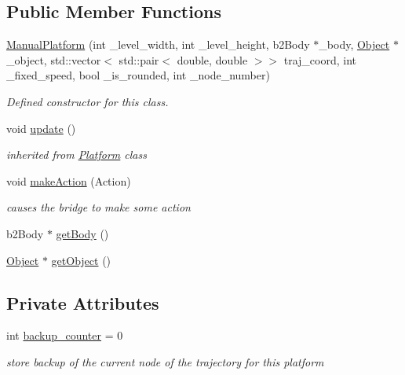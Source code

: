 \subsection*{Public Member Functions}
\begin{DoxyCompactItemize}
\item 
\hyperlink{class_manual_platform_a0192ef683b0f19b93bd238af98f8ce51}{Manual\+Platform} (int \+\_\+level\+\_\+width, int \+\_\+level\+\_\+height, b2\+Body $\ast$\+\_\+body, \hyperlink{class_object}{Object} $\ast$\+\_\+object, std\+::vector$<$ std\+::pair$<$ double, double $>$$>$ traj\+\_\+coord, int \+\_\+fixed\+\_\+speed, bool \+\_\+is\+\_\+rounded, int \+\_\+node\+\_\+number)
\begin{DoxyCompactList}\small\item\em Defined constructor for this class. \end{DoxyCompactList}\item 
\mbox{\label{class_manual_platform_ae77ccd8210c4ee32606b3475154325d4}} 
void \hyperlink{class_manual_platform_ae77ccd8210c4ee32606b3475154325d4}{update} ()
\begin{DoxyCompactList}\small\item\em inherited from \hyperlink{class_platform}{Platform} class \end{DoxyCompactList}\item 
void \hyperlink{class_manual_platform_ad7ae2aac108330a84246e3337fb5af81}{make\+Action} (Action)
\begin{DoxyCompactList}\small\item\em causes the bridge to make some action \end{DoxyCompactList}\item 
b2\+Body $\ast$ \hyperlink{class_manual_platform_ad8afd5278a85a63f1b597a3851bfc65d}{get\+Body} ()
\item 
\hyperlink{class_object}{Object} $\ast$ \hyperlink{class_manual_platform_ad7deba6261f272ed530786e0f742b2f5}{get\+Object} ()
\end{DoxyCompactItemize}
\subsection*{Private Attributes}
\begin{DoxyCompactItemize}
\item 
\mbox{\label{class_manual_platform_a8734cff028bd7e94fabc38be3f712534}} 
int \hyperlink{class_manual_platform_a8734cff028bd7e94fabc38be3f712534}{backup\+\_\+counter} = 0
\begin{DoxyCompactList}\small\item\em store backup of the current node of the trajectory for this platform \end{DoxyCompactList}\end{DoxyCompactItemize}
